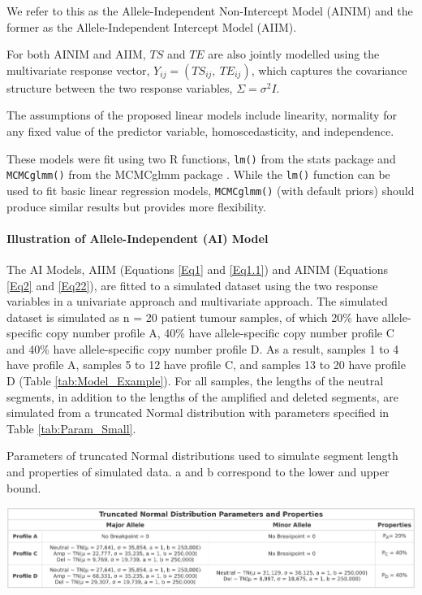 We refer to this as the Allele-Independent Non-Intercept Model (AINIM) and the former as the Allele-Independent Intercept Model (AIIM). 

For both AINIM and AIIM, $TS$ and $TE$ are also jointly modelled using the multivariate response vector, $Y_{ij}=(TS_{ij},\:TE_{ij})$, which captures the covariance structure between the two response variables, $\Sigma = \sigma^2 \textit{I}$. 

The assumptions of the proposed linear models include linearity, normality for any fixed value of the predictor variable, homoscedasticity, and independence. 

These models were fit using two R functions, \texttt{lm()} from the stats package \citep{stats} and \texttt{MCMCglmm()} from the MCMCglmm package \citep{MCMCglmm}. While the \texttt{lm()} function can be used to fit basic linear regression models, \texttt{MCMCglmm()} (with default priors) should produce similar results but provides more flexibility. 

\paragraph{Illustration of Allele-Independent (AI) Model}
\hfill
\newline

\noindent The AI Models, AIIM (Equations \ref{Eq1} and \ref{Eq1.1}) and AINIM (Equations \ref{Eq2} and \ref{Eq22}), are fitted to a simulated dataset using the two response variables in a univariate approach and multivariate approach. The simulated dataset is simulated as n = 20 patient tumour samples, of which 20\% have allele-specific copy number profile A, 40\% have allele-specific copy number profile C and 40\% have allele-specific copy number profile D. As a result, samples 1 to 4 have profile A, samples 5 to 12 have profile C, and samples 13 to 20 have profile D (Table \ref{tab:Model_Example}). For all samples, the lengths of the neutral segments, in addition to the lengths of the amplified and deleted segments, are simulated from a truncated Normal distribution with parameters specified in Table \ref{tab:Param_Small}. 

\begin{table}[!htb]
\center
\caption[Parameters of truncated Normal distributions used to simulate segment length and properties of simulated data.]{Parameters of truncated Normal distributions used to simulate segment length and properties of simulated data. a and b correspond to the lower and upper bound.}
\includegraphics[width = 1\textwidth]{../tables/Chapter_5/TN_Distribution_2.png}
\label{tab:Param_Small}
\end{table}

